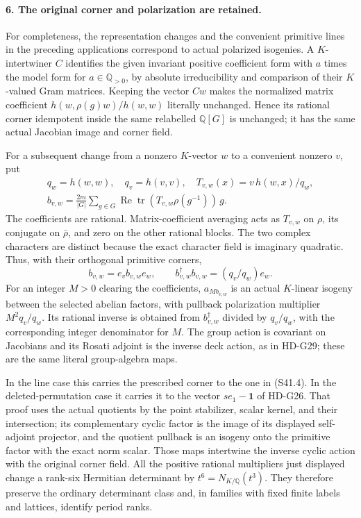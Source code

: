 \paragraph{6. The original corner and polarization are retained.}
For completeness, the representation changes and the convenient
primitive lines in the preceding applications correspond to
actual polarized isogenies. A \(K\)-intertwiner \(C\)
identifies the given invariant positive coefficient form with
\(a\) times the model form for \(a\in\mathbb Q_{>0}\),
by absolute irreducibility and comparison of their \(K\)-valued
Gram matrices. Keeping the vector \(Cw\) makes the normalized
matrix coefficient
\(h(w,\rho(g)w)/h(w,w)\) literally unchanged. Hence its
rational corner idempotent inside the same relabelled
\(\mathbb Q[G]\) is unchanged; it has the same actual
Jacobian image and corner field.

For a subsequent change from a nonzero \(K\)-vector \(w\)
to a convenient nonzero \(v\), put
\[
 \begin{gathered}
 q_w=h(w,w),\quad q_v=h(v,v),\quad
 T_{v,w}(x)=v\,h(w,x)/q_w,\\
 b_{v,w}=\frac{2m}{|G|}\sum_{g\in G}
 \operatorname{Re}\operatorname{tr}
       (T_{v,w}\rho(g^{-1}))\,g .
 \end{gathered}                                               \tag{S41.15}
\]
The coefficients are rational. Matrix-coefficient averaging
acts as \(T_{v,w}\) on \(\rho\), its conjugate on
\(\bar\rho\), and zero on the other rational blocks.
The two complex characters are distinct because the exact
character field is imaginary quadratic. Thus, with their
orthogonal primitive corners,
\[
     b_{v,w}=e_vb_{v,w}e_w,\qquad
     b_{v,w}^{\dagger}b_{v,w}=(q_v/q_w)e_w.                 \tag{S41.16}
\]
For an integer \(M>0\) clearing the coefficients,
\(a_{Mb_{v,w}}\) is an actual \(K\)-linear isogeny between
the selected abelian factors, with pullback polarization
multiplier \(M^2q_v/q_w\). Its rational inverse is obtained
from \(b_{v,w}^{\dagger}\) divided by \(q_v/q_w\),
with the corresponding integer denominator for \(M\).
The group action is covariant on Jacobians and its Rosati
adjoint is the inverse deck action, as in HD-G29; these are
the same literal group-algebra maps.

In the line case this carries the prescribed corner to the
one in (S41.4). In the deleted-permutation case it carries it
to the vector \(se_1-\boldsymbol1\) of HD-G26. That proof
uses the actual quotients by the point stabilizer, scalar
kernel, and their intersection; its complementary cyclic
factor is the image of its displayed self-adjoint projector,
and the quotient pullback is an isogeny onto the primitive
factor with the exact norm scalar. Those maps intertwine the
inverse cyclic action with the original corner field.
All the positive rational multipliers just displayed change
a rank-six Hermitian determinant by
\(t^6=N_{K/\mathbb Q}(t^3)\). They therefore preserve the
ordinary determinant class and, in families with fixed finite
labels and lattices, identify period ranks.


